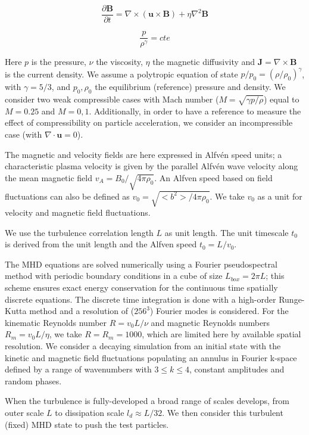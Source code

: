 \documentclass[%
aip,pop,amsmath,amssymb,
 reprint,%
]{revtex4-1}
\begin{document}
\begin{equation}
\frac{\partial \textbf{B}}{\partial t} = \nabla \times (\textbf{u} \times \textbf{B}) + \eta \nabla^2 \textbf{B}
\end{equation}

\begin{equation}
 \frac{p}{\rho^{\gamma}} = cte
\end{equation}


Here $p$ is the pressure, $\nu$ the viscosity, $\eta$ the magnetic 
diffusivity and
$\textbf{J}=\nabla \times \textbf{B} $ is the current density. 
We assume a polytropic 
equation of state $p/p_0= (\rho/\rho_0)^{\gamma}$, with $\gamma=5/3$, and
$p_0, \rho_0$ the equilibrium (reference) pressure and density. 
We consider two weak compressible cases with Mach number
($M= \sqrt{\gamma p/\rho}$) equal to $M=0.25$ and $M=0,1$. Additionally, 
in order to 
have a reference to measure the effect of compressibility on particle 
acceleration, we consider an
incompressible case (with $\nabla \cdot \textbf{u} = 0$).

The magnetic and velocity fields are here expressed in Alfv\'en speed units; 
a characteristic 
plasma velocity is given by the parallel Alfv\'en wave velocity
along the mean magnetic 
field $v_A = B_0/\sqrt{4\pi\rho_0}$. An Alfven speed based on field 
fluctuations can also be defined as $v_0=\sqrt{<b^2>/4\pi\rho_0}$. 
We take $v_0$ as a unit for velocity and magnetic field fluctuations. 

We use the turbulence correlation length $L$ as unit length. 
The unit timescale $t_0$
is derived from the unit length and the Alfven speed $t_0=L/v_0$.

The MHD equations are solved numerically using 
a Fourier pseudospectral method with periodic 
boundary conditions in a cube of size  $L_{box}=2\pi L$; 
this scheme ensures exact energy 
conservation for the continuous time spatially discrete equations. 
The discrete time 
integration is done with a high-order Runge-Kutta method and a
resolution of ($256^3$) 
Fourier modes is considered. For the kinematic Reynolds number 
$R=v_0L/\nu$ and magnetic Reynolds
numbers $R_m=v_0L/\eta$, 
we take $R=R_m= 1000$, which are limited here by available
spatial resolution. We consider a decaying simulation from an 
initial state with the kinetic 
and magnetic field fluctuations populating an annulus in Fourier k-space 
defined by a range of wavenumbers with
$ 3\leq k \leq4$, constant amplitudes and random phases.

When the turbulence is fully-developed a broad range of 
scales develops, from outer scale $L$ to 
dissipation scale $l_d\approx L/32$. We then consider this
turbulent (fixed) MHD state to push the test
particles.
\end{document}
